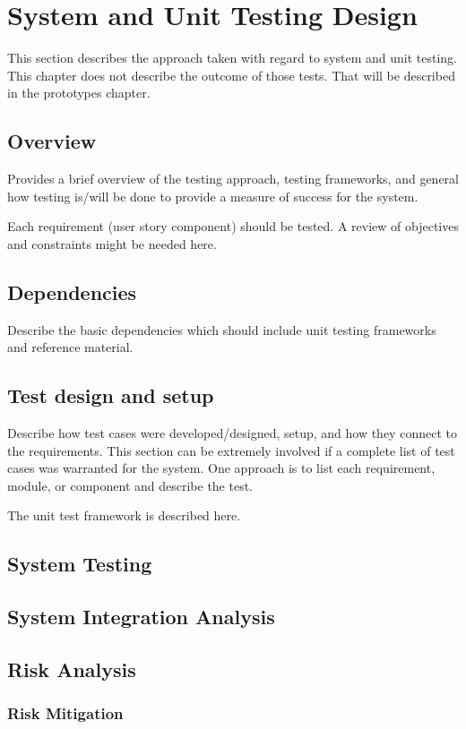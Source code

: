 

\chapter{System and Unit Testing Design}

This section describes the approach taken with regard to system and unit testing.    This chapter does not describe the outcome of those tests.  That will be described in the prototypes chapter.     

\section{Overview}
Provides a brief overview of the testing approach, testing frameworks, and general 
how testing is/will be done to provide a measure of success for the system. 

Each requirement (user story component) should be tested.    A review of objectives and
constraints might be needed here.  

\section{Dependencies}
Describe the basic dependencies which should include unit testing frameworks and 
reference material. 


\section{Test design and setup}
Describe how test cases were developed/designed, setup, and how they connect to the requirements.  This section can 
be extremely involved if a complete list of test cases was warranted for the system.   One 
approach is to list each requirement, module, or component and describe the test.

The unit test framework is described here.   

\section{System Testing}

\section{System Integration Analysis}

\section{Risk Analysis}

\subsection{Risk Mitigation}

